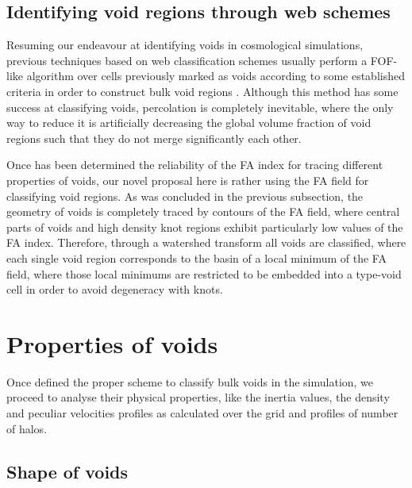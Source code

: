 \documentclass[a4,useAMS,usenatbib,usegraphicx]{latex/mn2e}
\begin{document}
\subsection{Identifying void regions through web schemes}
\label{subsec:identification}


Resuming our endeavour at identifying voids in cosmological simulations, 
previous techniques based on web classification schemes usually perform a 
FOF-like algorithm over cells previously marked as voids according to some 
established criteria in order to construct bulk void regions 
\SRKED{[references]}. Although this method has some success at classifying 
voids, percolation is completely inevitable, where the only way to reduce 
it is artificially decreasing the global volume fraction of void regions 
such that they do not merge significantly each other. 


Once has been determined the reliability of the FA index for tracing 
different properties of voids, our novel proposal here is rather using the 
FA field for classifying void regions. As was concluded in the previous 
subsection, the geometry of voids is completely traced by contours of the
FA field, where central parts of voids and high density knot regions 
exhibit particularly low values of the FA index. Therefore, through a 
watershed transform all voids are classified, where each single void 
region corresponds to the basin of a local minimum of the FA field, where
those local minimums are restricted to be embedded into a type-void cell
in order to avoid degeneracy with knots.


\section{Properties of voids}
\label{sec:properties}


Once defined the proper scheme to classify bulk voids in the simulation,
we proceed to analyse their physical properties, like the inertia values,
the density and peculiar velocities profiles as calculated over the grid 
and profiles of number of halos.


\subsection{Shape of voids}
\label{subsec:shape_voids}
\end{document}
